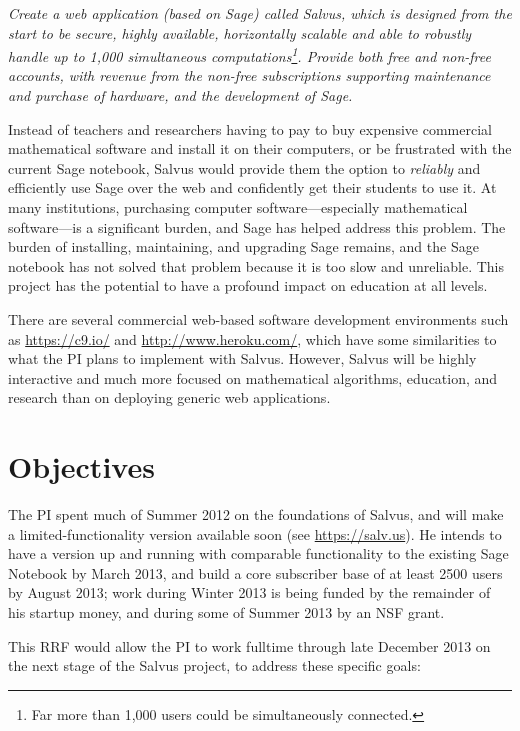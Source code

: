 \documentclass[11pt]{article}
\begin{document}
\newpage
{} {\em Create a web application (based on Sage)
  called Salvus, which is designed from the start to be secure, highly
  available, horizontally scalable and able to robustly handle up to
  1,000 simultaneous computations\footnote{Far more than 1,000 users could be simultaneously
  connected.}.  Provide both free and non-free accounts, with revenue
  from the non-free subscriptions supporting maintenance and purchase
  of hardware, and the development of Sage.}

Instead of teachers and researchers having to pay to buy expensive
commercial mathematical software and install it on their computers, or
be frustrated with the current Sage notebook, Salvus would provide
them the option to {\em reliably} and efficiently use Sage over the
web and confidently get their students to use it.  At many
institutions, purchasing computer software---especially mathematical
software---is a significant burden, and Sage has helped address this
problem. The burden of installing, maintaining, and upgrading Sage
remains, and the Sage notebook has not solved that problem because it
is too slow and unreliable.  This project has the potential to have a
profound impact on education at all levels.

There are several commercial web-based software development
environments such as \url{https://c9.io/} and
\url{http://www.heroku.com/}, which have some similarities to what the
PI plans to implement with Salvus.  However, Salvus will be highly
interactive and much more focused on mathematical algorithms,
education, and research than on deploying generic web applications.

\section{Objectives}

The PI spent much of Summer 2012 on the foundations of Salvus, and
will make a limited-functionality version available soon (see
\url{https://salv.us}).  He intends to have a version up and running
with comparable functionality to the existing Sage Notebook by March
2013, and build a core subscriber base of at least 2500 users by
August 2013; work during Winter 2013 is being funded by the remainder
of his startup money, and during some of Summer 2013 by an NSF grant.

This RRF would allow the PI to work
fulltime through late December 2013 on the next stage
of the Salvus project, to address these specific goals:
\end{document}
